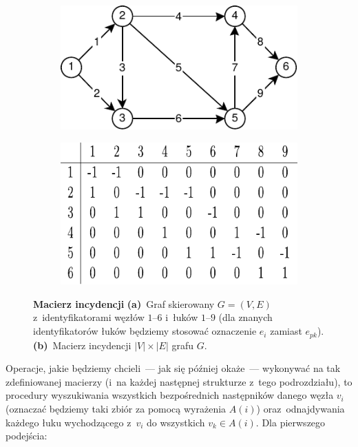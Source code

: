 \begin{figure}[!htbp]
	\centering
	\null\hfill
	\begin{subfigure}[b]{0.48\textwidth}
		\includegraphics[width=\textwidth]{Chapter_I/INCIDENCE-MATRIX-Example/a.pdf}
		\caption{}
		\label{fig:incidenceMatrix:a}
	\end{subfigure}
	\hfill
	\begin{subfigure}[b]{0.48\textwidth}
		\includegraphics[width=\textwidth]{Chapter_I/INCIDENCE-MATRIX-Example/b.pdf}
		\caption{}
		\label{fig:incidenceMatrix:b}
	\end{subfigure}
	\hfill\null
	\caption{
		\textbf{Macierz incydencji}
		\textbf{(a)}~Graf skierowany $G = \left( V, E \right)$ z~identyfikatorami węzłów $1$--$6$ i~łuków $1$--$9$ (dla znanych identyfikatorów łuków będziemy stosować oznaczenie $e_{i}$ zamiast $e_{pk}$).
		\textbf{(b)}~Macierz incydencji $\left| V \right| \times \left| E \right|$ grafu $G$.
	}
	\label{fig:incidenceMatrix}
\end{figure}

Operacje, jakie będziemy chcieli~--- jak się później okaże~--- wykonywać na tak zdefiniowanej macierzy (i~na każdej następnej strukturze z~tego podrozdziału), to procedury wyszukiwania wszystkich bezpośrednich następników danego węzła $v_{i}$ (oznaczać będziemy taki zbiór za pomocą wyrażenia $A \left( i \right)$) oraz~odnajdywania każdego łuku wychodzącego z~$v_{i}$ do wszystkich $v_{k} \in A \left( i \right)$.
Dla pierwszego podejścia:

